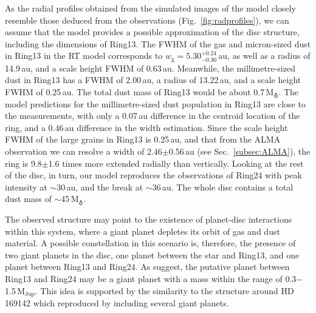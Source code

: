\documentclass[fleqn,usenatbib,useAMS]{mnras}
\begin{document}
As the radial profiles obtained from the simulated images of the model closely resemble those deduced from the observations (Fig.~\ref{fig:radprofiles}), we can assume that the model provides a possible approximation of the disc structure, including the dimensions of Ring13. The FWHM of the gas and micron-sized dust in Ring13 in the RT model corresponds to $w_\mathrm{g} = 5.30^{+0.24}_{-0.30}$\,au, as well as a radius of 14.9\,au, and a scale height FWHM of 0.63\,au. Meanwhile, the millimetre-sized dust in Ring13 has a FWHM of 2.00\,au, a radius of 13.22\,au, and a scale height FWHM of 0.25\,au. The total dust mass of Ring13 would be about 0.7\,M$_{\earth}$. The model predictions for the millimetre-sized dust population in Ring13 are close to the measurements, with only a 0.07\,au difference in the centroid location of the ring, and a 0.46\,au difference in the width estimation. Since the scale height FWHM of the large grains in Ring13 is 0.25\,au, and that from the ALMA observation we can resolve a width of 2.46$\pm$0.56\,au (see Sec.~\ref{subsec:ALMA}), the ring is 9.8$\pm$1.6 times more extended radially than vertically. Looking at the rest of the disc, in turn, our model reproduces the observations of Ring24 with peak intensity at $\sim$30\,au, and the break at $\sim$36\,au. The whole disc contains a total dust mass of $\sim$45\,M$_{\earth}$. %

The observed structure may point to the existence of planet-disc interactions within this system, where a giant planet depletes its orbit of gas and dust material. A possible constellation in this scenario is, therefore, the presence of two giant planets in the disc, one planet between the star and Ring13, and one planet between Ring13 and Ring24. As \citet{Ru_z_Rodr_guez_2019} suggest, the putative planet between Ring13 and Ring24 may be a giant planet with a mass within the range of 0.3$-$1.5\,$\mathrm{M}_{\mathrm{Jup}}$. This idea is supported by the similarity to the structure around HD\,169142 which \citet{2020arXiv200711565B} reproduced by including several giant planets.
\end{document}
